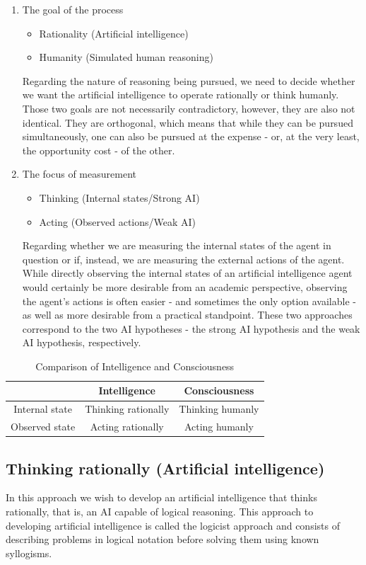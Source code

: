 \documentclass[masterthesis]{fer}
\begin{document}
\begin{enumerate}
\item{The goal of the process}
\begin{itemize}
\item{Rationality (Artificial intelligence)}
\item{Humanity (Simulated human reasoning)}
\end{itemize}

Regarding the nature of reasoning being pursued, we need to decide whether we want the artificial intelligence to operate rationally or think humanly. Those two goals are not necessarily contradictory, however, they are also not identical. They are orthogonal, which means that while they can be pursued simultaneously, one can also be pursued at the expense - or, at the very least, the opportunity cost - of the other.

\item{The focus of measurement}
\begin{itemize}
\item{Thinking (Internal states/Strong AI)}
\item{Acting (Observed actions/Weak AI)}
\end{itemize}
Regarding whether we are measuring the internal states of the agent in question or if, instead, we are measuring the external actions of the agent.
While directly observing the internal states of an artificial intelligence agent would certainly be more desirable from an academic perspective, observing the agent's actions is often easier - and sometimes the only option available - as well as more desirable from a practical standpoint.
These two approaches correspond to the two AI hypotheses - the strong AI hypothesis and the weak AI hypothesis, respectively.
\end{enumerate}

\begin{table}[h]
\centering
\begin{tabular}{|c|c|c|}
\hline
& Intelligence & Consciousness \\
\hline
\hline
Internal state & Thinking rationally & Thinking humanly \\
\hline
Observed state & Acting rationally & Acting humanly \\
\hline
\end{tabular}
\caption{Comparison of Intelligence and Consciousness}
\end{table}

\subsection{Thinking rationally (Artificial intelligence)}
In this approach we wish to develop an artificial intelligence that thinks rationally, that is, an AI capable of logical reasoning.
This approach to developing artificial intelligence is called the logicist approach and consists of describing problems in logical notation before solving them using known syllogisms.
\end{document}
